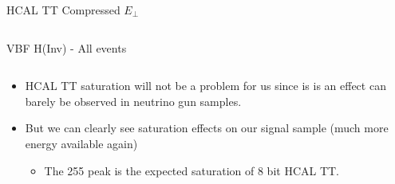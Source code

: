 \documentclass[8pt]{beamer}
\begin{document}
\begin{frame}{HCAL TT Compressed $E_{\perp}$}
\begin{columns}
\begin{block}{VBF H(Inv) - All events}
\end{block}

\end{columns}

\begin{tiny}

\begin{itemize}
  \item HCAL TT saturation will not be a problem for us since is is an effect can barely be observed in neutrino gun samples.
  \item But we can clearly see saturation effects on our signal sample (much more energy available again) 
  \begin{itemize}
    \tiny
    \item The 255 peak is the expected saturation of 8 bit HCAL TT.
  \end{itemize}
\end{itemize}

\end{tiny}

\end{frame}
\end{document}
